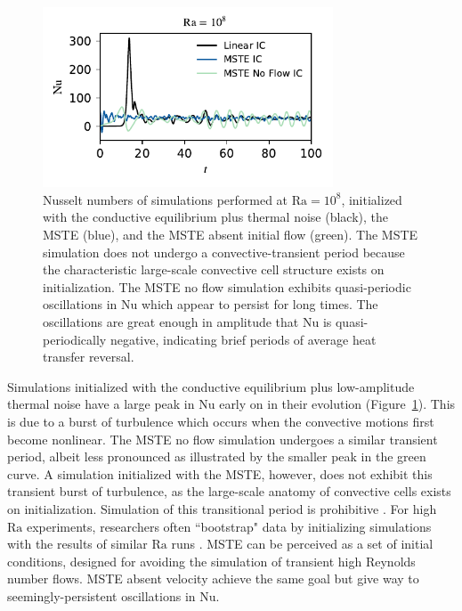 \documentclass[reprint,amsmath,amssymb,aps,nofootinbib]{revtex4-1}
\newcommand\Ra{\mathrm{Ra}}
\newcommand\Nu{\mathrm{Nu}}
\begin{document}
\begin{figure}
    \centering
    \includegraphics[width=3.4in]{sim_eq_nu_noflow.pdf}
    \caption{Nusselt numbers of simulations performed at $\Ra = 10^8$, initialized with the conductive equilibrium plus thermal noise (black), the MSTE (blue), and the MSTE absent initial flow (green). 
    The MSTE simulation does not undergo a convective-transient period because the characteristic large-scale convective cell structure exists on initialization.
    The MSTE no flow simulation exhibits quasi-periodic oscillations in $\Nu$ which appear to persist for long times.
    The oscillations are great enough in amplitude that $\Nu$ is quasi-periodically negative, indicating brief periods of average heat transfer reversal.}
    \label{fig:nu_sim}
\end{figure}

Simulations initialized with the conductive equilibrium plus low-amplitude thermal noise have a large peak in $\Nu$ early on in their evolution (Figure~\ref{fig:nu_sim}).
This is due to a burst of turbulence which occurs when the convective motions first become nonlinear.
The MSTE no flow simulation undergoes a similar transient period, albeit less pronounced as illustrated by the smaller peak in the green curve.
A simulation initialized with the MSTE, however, does not exhibit this transient burst of turbulence, as the large-scale anatomy of convective cells exists on initialization. 
Simulation of this transitional period is prohibitive \cite{Anders_AE}. 
For high $\Ra$ experiments, researchers often ``bootstrap" data by initializing simulations with the results of similar $\Ra$ runs \cite{Verzicco, Johnston}. 
MSTE can be perceived as a set of initial conditions, designed for avoiding the simulation of transient high Reynolds number flows.
MSTE absent velocity achieve the same goal but give way to seemingly-persistent oscillations in $\Nu$. 
\end{document}
